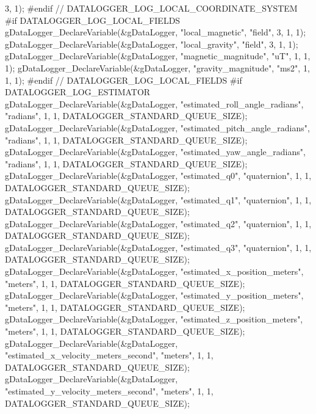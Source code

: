 \begin{DoxyCode}
{{       3, 1);}
\textcolor{comment}{    #endif // DATALOGGER\_LOG\_LOCAL\_COORDINATE\_SYSTEM}
\textcolor{comment}{}
\textcolor{comment}{    #if DATALOGGER\_LOG\_LOCAL\_FIELDS}
\textcolor{comment}{    gDataLogger\_DeclareVariable(&gDataLogger, "local\_magnetic", "field", 3, 1,
       1);}
\textcolor{comment}{    gDataLogger\_DeclareVariable(&gDataLogger, "local\_gravity", "field", 3, 1,
       1);}
\textcolor{comment}{    gDataLogger\_DeclareVariable(&gDataLogger, "magnetic\_magnitude", "uT", 1, 1,
       1);}
\textcolor{comment}{    gDataLogger\_DeclareVariable(&gDataLogger, "gravity\_magnitude", "ms2", 1, 1,
       1);}
\textcolor{comment}{    #endif // DATALOGGER\_LOG\_LOCAL\_FIELDS}
\textcolor{comment}{}
\textcolor{comment}{    #if DATALOGGER\_LOG\_ESTIMATOR}
\textcolor{comment}{    gDataLogger\_DeclareVariable(&gDataLogger, "estimated\_roll\_angle\_radians",
       "radians", 1, 1, DATALOGGER\_STANDARD\_QUEUE\_SIZE);}
\textcolor{comment}{    gDataLogger\_DeclareVariable(&gDataLogger, "estimated\_pitch\_angle\_radians",
       "radians", 1, 1, DATALOGGER\_STANDARD\_QUEUE\_SIZE);}
\textcolor{comment}{    gDataLogger\_DeclareVariable(&gDataLogger, "estimated\_yaw\_angle\_radians",
       "radians", 1, 1, DATALOGGER\_STANDARD\_QUEUE\_SIZE);}
\textcolor{comment}{    gDataLogger\_DeclareVariable(&gDataLogger, "estimated\_q0", "quaternion", 1,
       1, DATALOGGER\_STANDARD\_QUEUE\_SIZE);}
\textcolor{comment}{    gDataLogger\_DeclareVariable(&gDataLogger, "estimated\_q1", "quaternion", 1,
       1, DATALOGGER\_STANDARD\_QUEUE\_SIZE);}
\textcolor{comment}{    gDataLogger\_DeclareVariable(&gDataLogger, "estimated\_q2", "quaternion", 1,
       1, DATALOGGER\_STANDARD\_QUEUE\_SIZE);}
\textcolor{comment}{    gDataLogger\_DeclareVariable(&gDataLogger, "estimated\_q3", "quaternion", 1,
       1, DATALOGGER\_STANDARD\_QUEUE\_SIZE);}
\textcolor{comment}{    gDataLogger\_DeclareVariable(&gDataLogger, "estimated\_x\_position\_meters",
       "meters", 1, 1, DATALOGGER\_STANDARD\_QUEUE\_SIZE);}
\textcolor{comment}{    gDataLogger\_DeclareVariable(&gDataLogger, "estimated\_y\_position\_meters",
       "meters", 1, 1, DATALOGGER\_STANDARD\_QUEUE\_SIZE);}
\textcolor{comment}{    gDataLogger\_DeclareVariable(&gDataLogger, "estimated\_z\_position\_meters",
       "meters", 1, 1, DATALOGGER\_STANDARD\_QUEUE\_SIZE);}
\textcolor{comment}{    gDataLogger\_DeclareVariable(&gDataLogger,
       "estimated\_x\_velocity\_meters\_second", "meters", 1, 1, DATALOGGER\_STANDARD\_QUEUE\_SIZE);}
\textcolor{comment}{    gDataLogger\_DeclareVariable(&gDataLogger,
       "estimated\_y\_velocity\_meters\_second", "meters", 1, 1, DATALOGGER\_STANDARD\_QUEUE\_SIZE);}
}
\end{DoxyCode}
